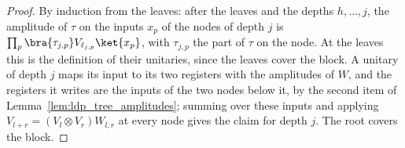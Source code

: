 \begin{proof}
    \leanok
    By induction from the leaves: after the leaves and the depths $h,\dots,j$,
    the amplitude of $\tau$ on the inputs $x_p$ of the nodes of depth $j$ is
    $\prod_p\bra{\tau_{j,p}}V_{\ell_{j,p}}\ket{x_p}$, with $\tau_{j,p}$ the part
    of $\tau$ on the node. At the leaves this is the definition of their
    unitaries, since the leaves cover the block. A unitary of depth $j$ maps its
    input to its two registers with the amplitudes of $W$, and the registers it
    writes are the inputs of the two nodes below it, by the second item of
    Lemma~\ref{lem:ldp_tree_amplitudes}; summing over these inputs and
    applying $V_{l+r}=(V_l\otimes V_r)W_{l,r}$ at every node gives the claim for
    depth $j$. The root covers the block.
\end{proof}

